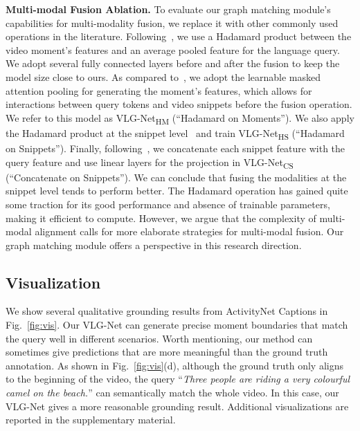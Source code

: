 \documentclass[10pt,twocolumn,letterpaper]{article}
\begin{document}
\noindent\textbf{Multi-modal Fusion Ablation.} To evaluate our graph matching module's capabilities for multi-modality fusion, we replace it with other commonly used operations in the literature. Following~\cite{2DTAN_2020_AAAI}, we use a Hadamard product between the video moment's features and an average pooled feature for the language query. We adopt several fully connected layers before and after the fusion to keep the model size close to ours. As compared to~\cite{2DTAN_2020_AAAI}, we adopt the learnable masked attention pooling for generating the moment's features, which allows for interactions between query tokens and video snippets before the fusion operation. We refer to this model as VLG-Net\textsubscript{HM} (``Hadamard on Moments'').
We also apply the Hadamard product at the snippet level~\cite{Mun_2020_CVPR,Rodriguez_2020_WACV,Zeng_2020_CVPR} and train VLG-Net\textsubscript{HS} (``Hadamard on Snippets''). Finally, following~\cite{chen_etal_2018_temporally,chenhierarchical,wang2020temporally}, we concatenate each snippet feature with the query feature and use linear layers for the projection in VLG-Net\textsubscript{CS} (``Concatenate on Snippets''). 
We can conclude that fusing the modalities at the snippet level tends to perform better. The Hadamard operation has gained quite some traction for its good performance and absence of trainable parameters, making it efficient to compute. However, we argue that the complexity of multi-modal alignment calls for more elaborate strategies for multi-modal fusion. Our graph matching module offers a perspective in this research direction. 

\subsection{Visualization} \label{subsec: qualitative}
We show several qualitative grounding results from ActivityNet Captions in Fig.~\ref{fig:vis}. Our VLG-Net can generate precise moment boundaries that match the query well in different scenarios. Worth mentioning, our method can sometimes give predictions that are more meaningful than the ground truth annotation. As shown in Fig.~\ref{fig:vis}(d), although the ground truth only aligns to the beginning of the video, the query ``\textit{Three people are riding a very colourful camel on the beach.}'' can semantically match the whole video. In this case, our VLG-Net gives a more reasonable grounding result. Additional visualizations are reported in the supplementary material. 
\end{document}
